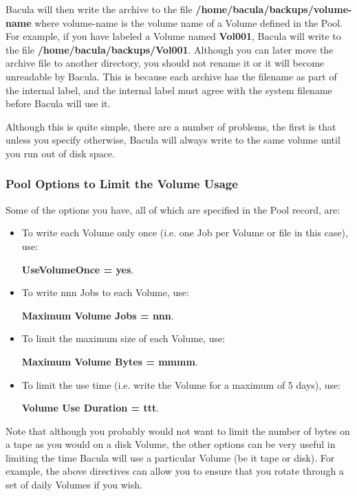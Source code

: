 Bacula will then write the archive to the file {\bf
/home/bacula/backups/\lt{}volume-name\gt{}} where \lt{}volume-name\gt{} is the
volume name of a Volume defined in the Pool. For example, if you have labeled
a Volume named {\bf Vol001}, Bacula will write to the file {\bf
/home/bacula/backups/Vol001}. Although you can later move the archive file to
another directory, you should not rename it or it will become unreadable by
Bacula. This is because each archive has the filename as part of the internal
label, and the internal label must agree with the system filename before
Bacula will use it. 

Although this is quite simple, there are a number of problems, the first is
that unless you specify otherwise, Bacula will always write to the same volume
until you run out of disk space. 

\subsubsection*{Pool Options to Limit the Volume Usage}

Some of the options you have, all of which are specified in the Pool record,
are: 

\begin{itemize}
\item To write each Volume only once (i.e. one Job per Volume or file  in this
   case), use:

{\bf UseVolumeOnce = yes}. 
\item To write nnn Jobs to each Volume, use:

   {\bf Maximum Volume Jobs = nnn}.  
\item To limit the maximum size of each Volume, use:

   {\bf Maximum Volume Bytes = mmmm}.  
\item To limit the use time (i.e. write the Volume for  a maximum of 5 days),
   use:

{\bf Volume Use Duration = ttt}. 
\end{itemize}

Note that although you probably would not want to limit the number of bytes on
a tape as you would on a disk Volume, the other options can be very useful in
limiting the time Bacula will use a particular Volume (be it tape or disk).
For example, the above directives can allow you to ensure that you rotate
through a set of daily Volumes if you wish. 

